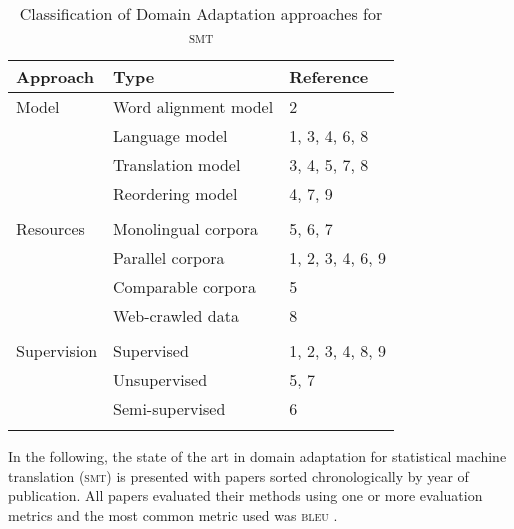 \documentclass[output=paper]{LSP/langsci}
\begin{document}
\begin{table}
\begin{tabular}{lll}
\lsptoprule
Approach &  Type &  Reference \\
\midrule
{Model} &  Word alignment model  & 2\\
						& Language model& 1, 3, 4, 6, 8 \\
						& Translation model & 3, 4, 5, 7, 8 \\
						& Reordering model  & 4, 7, 9 \\
\\
{Resources} &  Monolingual corpora &   5, 6, 7\\
						& Parallel corpora & 1, 2, 3, 4, 6, 9\\
						& Comparable corpora & 5 \\
						& Web-crawled data & 8 \\
\\
{Supervision} & Supervised &  1, 2, 3, 4, 8, 9\\
						& Unsupervised& 5, 7 \\
						& Semi-supervised  & 6 \\
\lspbottomrule
\end{tabular}
\caption{Classification of Domain Adaptation approaches for \textsc{smt}}
\label{tab:dumavertan:1}
\end{table}

In the following, the state of the art in domain adaptation for statistical machine translation (\textsc{smt}) is presented with papers sorted chronologically by year of publication. All papers evaluated their methods using one or more evaluation metrics and the most common metric used was \textsc{bleu} \citep{PapineniEtAl2002}.
\end{document}
